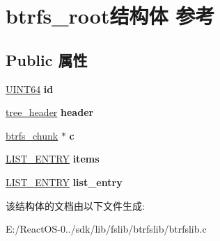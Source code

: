 \hypertarget{structbtrfs__root}{}\section{btrfs\+\_\+root结构体 参考}
\label{structbtrfs__root}
\subsection*{Public 属性}
\begin{DoxyCompactItemize}
\item 
\mbox{\label{structbtrfs__root_abf978c130a474fb50d314cb6d2912b45}} 
\hyperlink{_processor_bind_8h_a57be03562867144161c1bfee95ca8f7c}{U\+I\+N\+T64} {\bfseries id}
\item 
\mbox{\label{structbtrfs__root_ab188cc6e657bf9d7939c789aad9addb4}} 
\hyperlink{structtree__header}{tree\+\_\+header} {\bfseries header}
\item 
\mbox{\label{structbtrfs__root_ab2dcb7b8bc99ed9f0a3e47e98bedf5ab}} 
\hyperlink{structbtrfs__chunk}{btrfs\+\_\+chunk} $\ast$ {\bfseries c}
\item 
\mbox{\label{structbtrfs__root_a5af62fc050f88f8b7f5508aad43bb575}} 
\hyperlink{struct___l_i_s_t___e_n_t_r_y}{L\+I\+S\+T\+\_\+\+E\+N\+T\+RY} {\bfseries items}
\item 
\mbox{\label{structbtrfs__root_a180f565807b9eac1e74969b656796713}} 
\hyperlink{struct___l_i_s_t___e_n_t_r_y}{L\+I\+S\+T\+\_\+\+E\+N\+T\+RY} {\bfseries list\+\_\+entry}
\end{DoxyCompactItemize}


该结构体的文档由以下文件生成\+:\begin{DoxyCompactItemize}
\item 
E\+:/\+React\+O\+S-\/0../sdk/lib/fslib/btrfslib/btrfslib.\+c\end{DoxyCompactItemize}
